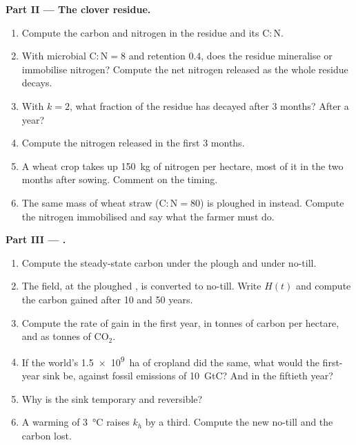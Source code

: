 \begin{problem}
\medskip
\noindent\textbf{Part II --- The clover residue.}
\begin{enumerate}[resume]
  \item Compute the carbon and nitrogen in the residue and its
        $\mathrm{C:N}$.
  \item With microbial $\mathrm{C:N} = 8$ and retention $0.4$, does
        the residue mineralise or immobilise nitrogen? Compute the
        net nitrogen released as the whole residue decays.
  \item With $k = 2$, what fraction of the residue has decayed after
        3 months? After a year?
  \item Compute the nitrogen released in the first 3 months.
  \item A wheat crop takes up \qty{150}{kg} of nitrogen per hectare,
        most of it in the two months after sowing. Comment on the
        timing.
  \item The same mass of wheat straw ($\mathrm{C:N} = 80$) is
        ploughed in instead. Compute the nitrogen immobilised and
        say what the farmer must do.
\end{enumerate}

\medskip
\noindent\textbf{Part III --- .}
\begin{enumerate}[resume]
  \item Compute the steady-state  carbon under the plough and
        under no-till.
  \item The field, at the ploughed , is converted to
        no-till. Write $H(t)$ and compute the carbon gained after
        10 and 50 years.
  \item Compute the rate of gain in the first year, in tonnes of
        carbon per hectare, and as tonnes of $\mathrm{CO_2}$.
  \item If the world's \qty{1.5e9}{ha} of cropland did the same,
        what would the first-year sink be, against fossil emissions
        of \qty{10}{GtC}? And in the fiftieth year?
  \item Why is the sink temporary and reversible?
  \item A warming of \qty{3}{\celsius} raises $k_h$ by a third.
        Compute the new no-till  and the carbon lost.
\end{enumerate}


\end{problem}
